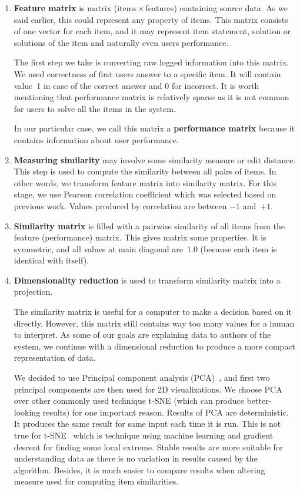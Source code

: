 \documentclass[
  printed, %
  table,   %
  nolof,     %
  nolot,     %
  color,
  final,
  nocover
]{fithesis3}
\begin{document}
\begin{enumerate}
  \item
    \textbf{Feature matrix} is matrix (items\,$\times$\,features) containing source data. As we said earlier, this could represent any property of items. This matrix consists of one vector for each item, and it may represent item statement, solution or solutions of the item and naturally even users performance.

    The first step we take is converting raw logged information into this matrix. We used correctness of first users answer to a specific item. It will contain value~1 in case of the correct answer and 0 for incorrect. It is worth mentioning that performance matrix is relatively sparse as it is not common for users to solve all the items in the system.

    In our particular case, we call this matrix a \textbf{performance matrix} because it contains information about user performance.

  \item
    \textbf{Measuring similarity} may involve some similarity measure or edit distance. This step is used to compute the similarity between all pairs of items. In other words, we transform feature matrix into similarity matrix. For this stage, we use Pearson correlation coefficient which was selected based on previous work. Values produced by correlation are between $-1$ and~$+1$.

  \item
    \textbf{Similarity matrix} is filled with a pairwise similarity of all items from the feature (performance) matrix. This gives matrix some properties. It is symmetric, and all values at main diagonal are~$1.0$ (because each item is identical with itself).

  \item
    \textbf{Dimensionality reduction} is used to transform similarity matrix into a projection.


    The similarity matrix is useful for a computer to make a decision based on it directly. However, this matrix still contains way too many values for a human to interpret. As some of our goals are explaining data to authors of the system, we continue with a dimensional reduction to produce a more compact representation of data.


    We decided to use Principal component analysis (PCA)~\cite{wold1987principal}, and first two principal components are then used for 2D visualizations. We choose PCA over other commonly used technique t-SNE (which can produce better-looking results) for one important reason. Results of PCA are deterministic. It produces the same result for same input each time it is run. This is not true for t-SNE~\cite{maaten2008visualizing} which is technique using machine learning and gradient descent for finding some local extreme. Stable results are more suitable for understanding data as there is no variation in results caused by the algorithm. Besides, it is much easier to compare results when altering measure used for computing item similarities.


\end{enumerate}
\end{document}
